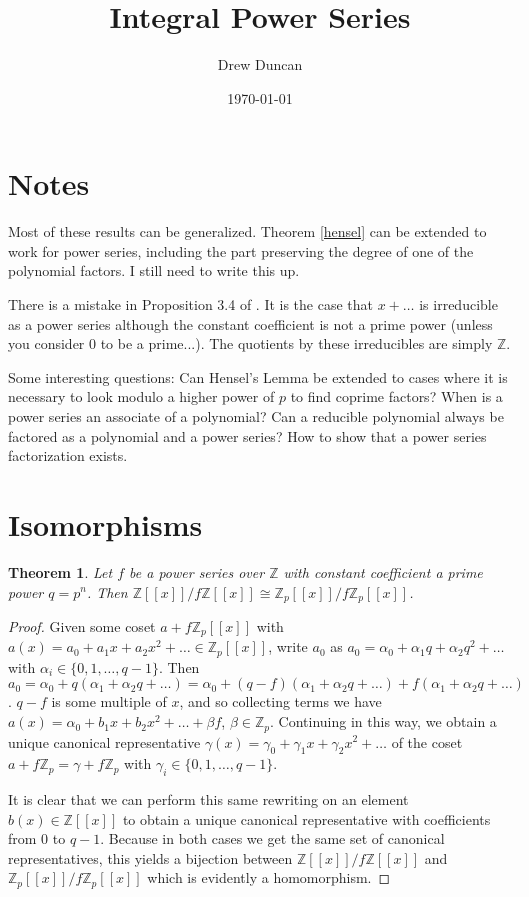 \documentclass{article}
\title{Integral Power Series}
\author{Drew Duncan}
\date{\today}
\newtheorem{theorem}{Theorem}
\begin{document}
\maketitle

\section{Notes}
Most of these results can be generalized. Theorem \ref{hensel} can be extended to work for power series, including the part preserving the degree of one of the polynomial factors.  I still need to write this up.

There is a mistake in Proposition 3.4 of \cite{integerpowerseries_MR2416254}.  It is the case that $x + \ldots$ is irreducible as a power series although the constant coefficient is not a prime power (unless you consider 0 to be a prime...).  The quotients by these irreducibles are simply $\mathbb{Z}$.


Some interesting questions:  Can Hensel's Lemma be extended to cases where it is necessary to look modulo a higher power of $p$ to find coprime factors?  When is a power series an associate of a polynomial?  Can a reducible polynomial always be factored as a polynomial and a power series?  How to show that a power series factorization exists.

\section{Isomorphisms}
\begin{theorem} \label{iso1}
Let $f$ be a power series over $\mathbb{Z}$ with constant coefficient a prime power $q = p^n$.  Then $\mathbb{Z}[[x]]/f\mathbb{Z}[[x]] \cong \mathbb{Z}_p[[x]]/f\mathbb{Z}_p[[x]]$.
\end{theorem}
\begin{proof}
Given some coset $a + f\mathbb{Z}_p[[x]]$ with $a(x) = a_0 + a_1x + a_2x^2 + \ldots \in \mathbb{Z}_p[[x]]$, write $a_0$ as $a_0 = \alpha_0 + \alpha_1q + \alpha_2q^2 + \ldots$ with $\alpha_i \in \{0,1,\ldots,q-1\}$.  Then $a_0 = \alpha_0 + q(\alpha_1 + \alpha_2q + \ldots) = \alpha_0 + (q-f)(\alpha_1 + \alpha_2q + \ldots) + f(\alpha_1 + \alpha_2q + \ldots)$.  $q-f$ is some multiple of $x$, and so collecting terms we have $a(x) = \alpha_0 + b_1x + b_2x^2 + \ldots + \beta f$, $\beta \in \mathbb{Z}_p$.  Continuing in this way, we obtain a unique canonical representative $\gamma(x) = \gamma_0 + \gamma_1x + \gamma_2x^2 + \ldots$ of the coset $a + f\mathbb{Z}_p = \gamma + f\mathbb{Z}_p$ with $\gamma_i \in \{0,1,\ldots,q-1\}$.

It is clear that we can perform this same rewriting on an element $b(x) \in \mathbb{Z}[[x]]$ to obtain a unique canonical representative with coefficients from $0$ to $q-1$.  Because in both cases we get the same set of canonical representatives, this yields a bijection between $\mathbb{Z}[[x]]/f\mathbb{Z}[[x]]$ and $\mathbb{Z}_p[[x]]/f\mathbb{Z}_p[[x]]$ which is evidently a homomorphism.
\end{proof}
\end{document}
